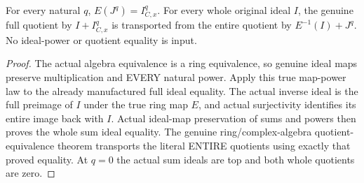 \begin{lemma}
\label{hir:smooth-centre-entire-normal-powers-quotient-transport}
\leanok
For every natural $q$, $E(J^q)=I_{C,x}^q$. For every whole original ideal $I$,
the genuine full quotient by $I+I_{C,x}^q$ is transported from the entire
quotient by $E^{-1}(I)+J^q$. No ideal-power or quotient equality is input.
\end{lemma}
\begin{proof}
The actual algebra equivalence is a ring equivalence, so genuine ideal maps
preserve multiplication and EVERY natural power. Apply this true map-power
law to the already manufactured full ideal equality. The actual inverse
ideal is the full preimage of $I$ under the true ring map $E$, and actual
surjectivity identifies its entire image back with $I$. Actual ideal-map
preservation of sums and powers then proves the whole sum ideal equality.
The genuine ring/complex-algebra quotient-equivalence theorem transports the
literal ENTIRE quotients using exactly that proved equality. At $q=0$ the
actual sum ideals are top and both whole quotients are zero.
\end{proof}

